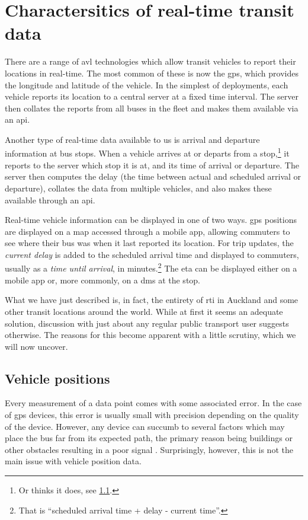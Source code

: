 \section{Charactersitics of real-time transit data}
\label{sec:realtime-data}

There are a range of \gls{avl} technologies which allow transit vehicles to report their locations in real-time. The most common of these is now the \gls{gps}, which provides the longitude and latitude of the vehicle. In the simplest of deployments, each vehicle reports its location to a central server at a fixed time interval. The server then collates the reports from all buses in the fleet and makes them available via an \gls{api}.


Another type of real-time data available to us is arrival and departure information at bus stops. When a vehicle arrives at or departs from a stop,\footnote{Or thinks it does, see \cref{sec:vp_data}.} it reports to the server which stop it is at, and its time of arrival or departure. The server then computes the delay (the time between actual and scheduled arrival or departure), collates the data from multiple vehicles, and also makes these available through an \gls{api}.


Real-time vehicle information can be displayed in one of two ways. \Gls{gps} positions are displayed on a map accessed through a mobile app, allowing commuters to see where their bus was when it last reported its location. For trip updates, the \emph{current delay} is added to the scheduled arrival time and displayed to commuters, usually as a \emph{time until arrival}, in minutes.\footnote{That is ``scheduled arrival time + delay - current time''.} The \gls{eta} can be displayed either on a mobile app or, more commonly, on a \gls{dms} at the stop.


What we have just described is, in fact, the entirety of \gls{rti} in Auckland and some other transit locations around the world. While at first it seems an adequate solution, discussion with just about any regular public transport user suggests otherwise. The reasons for this become apparent with a little scrutiny, which we will now uncover.


\subsection{Vehicle positions}
\label{sec:vp_data}

Every measurement of a data point comes with some associated error. In the case of \gls{gps} devices, this error is usually small with precision depending on the quality of the device. However, any device can succumb to several factors which may place the bus far from its expected path, the primary reason being buildings or other obstacles resulting in a poor signal \citep{Xinghao_2013,Mutambara_2000,Zhao_1997}. Surprisingly, however, this is not the main issue with vehicle position data.


